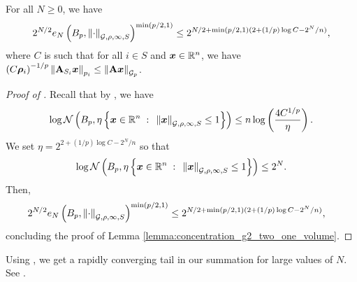 \documentclass[11pt]{article}
\numberwithin{equation}{section}
\begin{document}
\begin{lemma}
\label{lemma:concentration_g2_two_one_volume}
For all $N \ge 0$, we have
\begin{align*}
    2^{N/2}e_N\left(B_p, \left\lVert \cdot \right\rVert_{\mathcal{G},\rho,\infty, S}\right)^{\min(p/2,1)} \le 2^{N/2 + \min(p/2,1)(2+(1/p)\log C - 2^N/n)},
\end{align*}
where $C$ is such that for all $i \in S$ and $\bm{x}\in\mathbb{R}^n$, we have $\left(C\bm{\rho}_i\right)^{-1/p}\left\lVert \mathbf{A}_{S_i}\bm{x} \right\rVert_{p_i} \le \left\lVert \mathbf{A}\bm{x} \right\rVert_{\mathcal{G}_{p}}$.
\end{lemma}
\begin{proof}[Proof of ]
Recall that by , we have
\begin{align*}
    \log\mathcal{N}\left(B_p,\eta\left\{\bm{x}\in\mathbb{R}^n{\;\; : \;\;}\left\lVert \bm{x} \right\rVert_{\mathcal{G},\rho,\infty, S}\le 1\right\}\right) \le n\log\left(\frac{4C^{1/p}}{\eta}\right).
\end{align*}
We set $\eta = 2^{2+(1/p)\log C - 2^N/n}$ so that
\begin{align*}
    \log\mathcal{N}\left(B_p,\eta\left\{\bm{x}\in\mathbb{R}^n{\;\; : \;\;}\left\lVert \bm{x} \right\rVert_{\mathcal{G},\rho,\infty, S}\le 1\right\}\right) \le 2^N.
\end{align*}
Then,
\begin{align*}
    2^{N/2}e_N\left(B_p, \left\lVert \cdot \right\rVert_{\mathcal{G},\rho,\infty, S}\right)^{\min(p/2,1)} &\le 2^{N/2 + \min(p/2,1)(2+(1/p)\log C - 2^N/n)},
\end{align*}
concluding the proof of Lemma \ref{lemma:concentration_g2_two_one_volume}.
\end{proof}

Using , we get a rapidly converging tail in our summation for large values of $N$. See .
\end{document}
